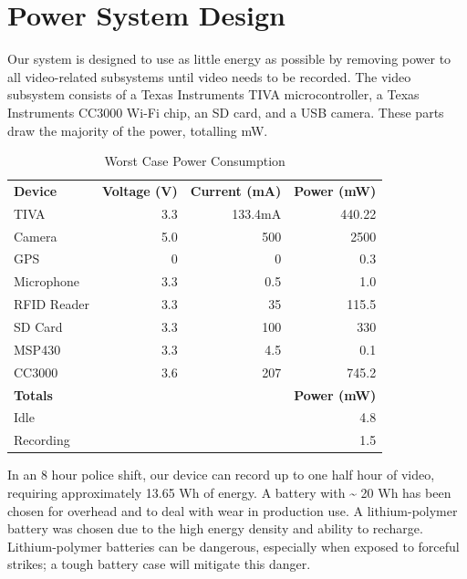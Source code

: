 \documentclass[12pt]{article}
\begin{document}
\section{Power System Design}
Our system is designed to use as little energy as possible by removing power to
all video-related subsystems until video needs to be recorded. The video
subsystem consists of a Texas Instruments TIVA
microcontroller\cite{tm4c1294ncpdt}, a Texas Instruments CC3000 Wi-Fi
chip\cite[p.~6]{cc3000}, an SD card\cite[p.~19,23]{sd_standard}, and a USB
camera\cite{usb_standard}. These parts draw the majority of the power, totalling
mW.

\begin{table}[h!]
    \centering
    \caption{Worst Case Power Consumption}
    \begin{tabular}{lrrr}
        \textbf{Device} & \textbf{Voltage (V)} & \textbf{Current (mA)} & \textbf{Power (mW)}\\
        TIVA & 3.3 & 133.4mA & 440.22\\
        Camera & 5.0 & 500 & 2500\\
        GPS & 0 & 0 & 0.3\\ %
        Microphone & 3.3 & 0.5 & 1.0\\
        RFID Reader & 3.3 & 35 & 115.5\\
        SD Card & 3.3 & 100 & 330\\ %
        MSP430 & 3.3 & 4.5 & 0.1\\
        CC3000 & 3.6 & 207 & 745.2\\
        \hline
        \textbf{Totals} & & & \textbf{Power (mW)}\\
        Idle & & & 4.8\\ %
        Recording & & & 1.5\\ %
    \end{tabular}
\end{table}

In an 8 hour police shift, our device can record up to one half hour of video,
requiring approximately 13.65 Wh of energy. A battery with \textasciitilde{} 20
Wh has been chosen for overhead and to deal with wear in production use. A
lithium-polymer battery was chosen due to the high energy density and ability
to recharge. Lithium-polymer batteries can be dangerous, especially when
exposed to forceful strikes; a tough battery case will mitigate this danger.
\end{document}
